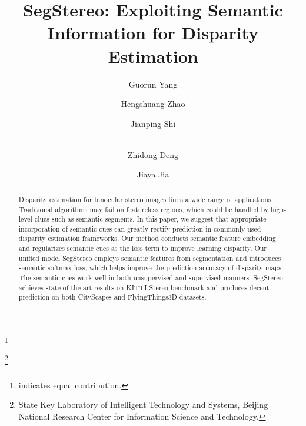 \documentclass[runningheads]{llncs}
\newcommand\blfootnote[1]{
  \begingroup
  \renewcommand\thefootnote{}\footnote{#1}
  \addtocounter{footnote}{-1}
  \endgroup
}
\begin{document}
\title{SegStereo: Exploiting Semantic Information for Disparity Estimation} 

\author{
{Guorun Yang} \and
{Hengshuang Zhao} \and
{Jianping Shi} \and \\
{Zhidong Deng} \and
{Jiaya Jia}
}



\maketitle              

\blfootnote{ indicates equal contribution.}
\blfootnote{ State Key Laboratory of Intelligent Technology and Systems, Beijing National Research Center for Information Science and Technology.}
\setcounter{footnote}{0}

\begin{abstract}

Disparity estimation for binocular stereo images finds a wide range of applications. Traditional algorithms may fail on featureless regions, which could be handled by high-level clues such as semantic segments. In this paper, we suggest that appropriate incorporation of semantic cues can greatly rectify prediction in commonly-used disparity estimation frameworks. Our method conducts semantic feature embedding and regularizes semantic cues as the loss term to improve learning disparity. Our unified model {SegStereo} employs semantic features from segmentation and introduces semantic softmax loss, which helps improve the prediction accuracy of disparity maps. The semantic cues work well in both unsupervised and supervised manners. {SegStereo} achieves state-of-the-art results on KITTI Stereo benchmark and produces decent prediction on both CityScapes and FlyingThings3D datasets.


\end{abstract}
\end{document}
